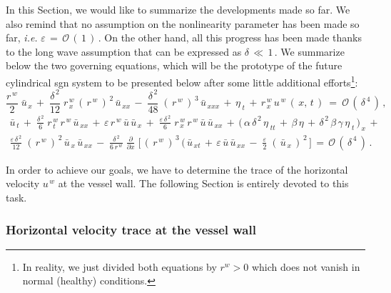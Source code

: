 \documentclass[alpha-refs, 12pt]{wiley-article}
\renewcommand{\O}{\mathcal{O}}
\newcommand{\eps}{\varepsilon}
\begin{document}
In this Section, we would like to summarize the developments made so far. We also remind that no assumption on the nonlinearity parameter has been made so far, \emph{i.e.} $\eps\,=\,\O\,(\,1\,)\,$. On the other hand, all this progress has been made thanks to the long wave assumption that can be expressed as $\delta\, \ll \, 1\,$. We summarize below the two governing equations, which will be the prototype of the future cylindrical \acrshort{sgn} system to be presented below after some little additional efforts\footnote{In reality, we just divided both equations by $r^{w} > 0$ which does not vanish in normal (healthy) conditions.}:
\begin{equation}\label{eq:se1}
  \frac{r^{\,w}}{2}\;\bar{u}_{\,x}\,+\;\frac{\delta^{\,2}}{12}\;r^{\,w}_{\,x}\,(\,r^{\,w}\,)^{\,2}\,\bar{u}_{\,xx}\,-\;\frac{\delta^{\,2}}{48}\;(\,r^{\,w}\,)^{\,3}\,\bar{u}_{\,xxx}\,+\,\eta_{\;t}\,+\,r^{\,w}_{\,x}\,u^{\,w}\,(\,x,\,t\,)\ =\ \O\,(\,\delta^{\,4}\,)\,,
\end{equation}
\begin{multline}\label{eq:se2}
   \bar{u}_{\,t}\,+\;\frac{\delta^{\,2}}{6}\;r^{\,w}_{\,t}\,r^{\,w}\,\bar{u}_{\,xx}\,+\,\eps\, r^{\,w}\,\bar{u}\,\bar{u}_{\,x}\,+\;\frac{\eps\,\delta^{\,2}}{6}\;r^{\,w}_{\,x}\,r^{\,w}\,\bar{u}\,\bar{u}_{\,xx}\,+\,\bigl(\,\alpha\,\delta^{\,2}\,\eta_{\;tt}\,+\,\beta\,\eta\, + \,\delta^{\,2}\,\beta\,\gamma\,\eta_{\;t}\,\bigr)_{\,x}\, +\\
   \frac{\eps\,\delta^{\,2}}{12}\;(\,r^{\,w}\,)^{\,2}\,\bar{u}_{\,x}\,\bar{u}_{\,xx}\,-\;\frac{\delta^{\,2}}{6\,r^{\,w}}\;\frac{\partial}{\partial x}\;\biggl[ \,(\,r^{\,w}\,)^{\,3}\,(\,\bar{u}_{\,xt}\,+\,\eps\,\bar{u}\,\bar{u}_{\,xx}\,-\;\frac{\eps}{2}\;(\,\bar{u}_{\,x}\,)^{\,2}\,\biggr]\,=\,\O\,(\,\delta^{\,4}\,)\,.
\end{multline}

In order to achieve our goals, we have to determine the trace of the horizontal velocity $u^{\,w}$ at the vessel wall. The following Section is entirely devoted to this task.

\subsubsection{Horizontal velocity trace at the vessel wall}
\end{document}
